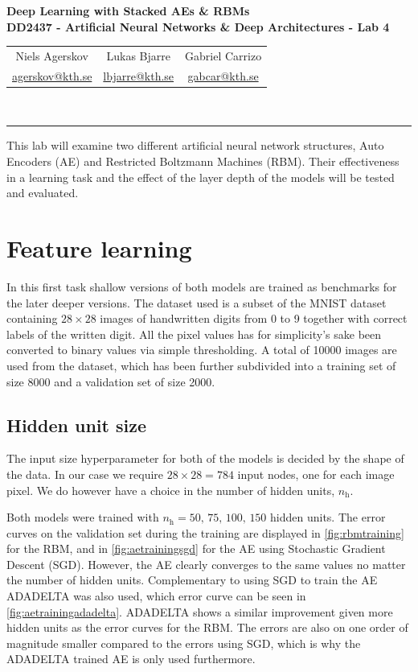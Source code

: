 \documentclass{article}
\newcommand{\mail}[1]{
  \href{mailto:#1}{#1}
}
\begin{document}
\begin{center}
  \textbf{
    \LARGE Deep Learning with Stacked AEs \& RBMs \\
    \vspace{.5ex}
    \large DD2437 - Artificial Neural Networks \& Deep Architectures - Lab 4\\
    \vspace{1ex}
  }
  \large
  \begin{tabular}{ccc}
    Niels Agerskov & Lukas Bjarre & Gabriel Carrizo \\
    \mail{agerskov@kth.se} & \mail{lbjarre@kth.se} & \mail{gabcar@kth.se}
  \end{tabular}
  \\
  \vspace{.5ex}
  \rule{\textwidth}{0.4pt}
\end{center}

This lab will examine two different artificial neural network structures,
Auto Encoders (AE) and Restricted Boltzmann Machines (RBM).
Their effectiveness in a learning task 
and the effect of the layer depth of the models
will be tested and evaluated.

\section{Feature learning}
In this first task shallow versions of both models are trained
as benchmarks for the later deeper versions.
The dataset used is a subset of the MNIST dataset
containing $28 \times 28$ images of handwritten digits from 0 to 9
together with correct labels of the written digit.
All the pixel values has for simplicity's sake been converted to binary values
via simple thresholding.
A total of 10000 images are used from the dataset,
which has been further subdivided into a training set of size 8000 and a validation set of size 2000.

\subsection{Hidden unit size}
The input size hyperparameter for both of the models is decided by the shape of the data.
In our case we require $28 \times 28 = 784$ input nodes, one for each image pixel.
We do however have a choice in the number of hidden units, $n_{\text{h}}$.

Both models were trained with $n_\text{h} = 50,\,75,\,100,\,150$ hidden units.
The error curves on the validation set during the training are displayed
in \cref{fig:rbmtraining} for the RBM,
and in \cref{fig:aetrainingsgd} for the AE using Stochastic Gradient Descent (SGD).
However, the AE clearly converges to the same values no matter the number of hidden units.
Complementary to using SGD to train the AE ADADELTA was also used,
which error curve can be seen in \cref{fig:aetrainingadadelta}.
ADADELTA shows a similar improvement given more hidden units as the error curves for the RBM.
The errors are also on one order of magnitude smaller compared to the errors using SGD,
which is why the ADADELTA trained AE is only used furthermore.
\end{document}
